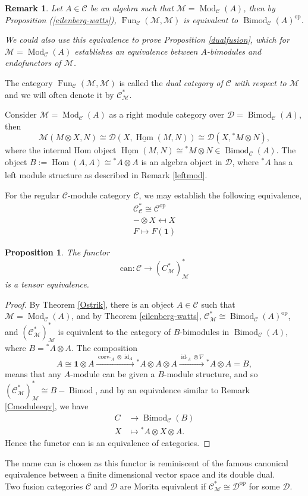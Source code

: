 \documentclass[11pt]{book}
\newtheorem{Prop}[theorem]{Proposition}
\theoremstyle{Rem}
\newtheorem{Rem}[theorem]{Remark}
\theoremstyle{definition}
\numberwithin{equation}{section}
\newcommand\id{\operatorname{id}}
\newcommand\ot{\otimes}
\newcommand\Bimod{\operatorname{Bimod}}
\newcommand\Fun{\operatorname{Fun}}
\newcommand\Hom{\operatorname{Hom}}
\newcommand\Mod{\operatorname{Mod}}
\newcommand\op{^{\text{op}}}
\newcommand\M{\mathcal{M}}
\newcommand\C{\mathcal C}
\newcommand\D{\mathcal D}
\newcommand{\ra}\rightarrow
\newcommand{\xra}\xrightarrow
\newcommand\one{\mathbf{1}}
\newcommand\coev{\operatorname{coev}}
\begin{document}
\begin{Rem}\rm
Let $A\in \C$ be an algebra such that $\M = \Mod_\C(A)$, then by Proposition (\ref{eilenberg-watts}),  $\Fun_\C(\M, \M)$ is equivalent to $\Bimod_\C(A)\op$.


 We could also use this equivalence to prove Proposition \ref{dualfusion}, which for $\M=\Mod_\C(A)$ establishes an equivalence between $A$-bimodules and endofunctors of $\M$.
\end{Rem}
The category $\Fun_\C(\M, \M)$ is called the \textit{dual category of $\C$ with respect to $\M$} and we will often denote it by $\C^*_\M$. 

Consider $\M = \Mod_\C(A)$ as a right module category over $\D =\Bimod_\C(A)$, then \begin{equation}
	\M(M\ot X, N) \cong \D(X, \underline{\Hom}(M, N)) \cong \D(X, {}^*M\ot N),
\end{equation} where the internal Hom  object $\underline{\Hom}(M, N) \cong {}^*M \ot N\in\Bimod_\C(A)$. The object $B:=\underline{\Hom(A, A)}\cong {}^*A\ot A$ is an algebra object in $\D$, where ${}^*A$ has a left module structure as described in Remark \ref{leftmod}. 

For the regular $\C$-module category $\C$, we may establish the following equivalence, 
\begin{align}
	\C^*_\C\cong \C\op\\
	- \ot X \mapsfrom X\\
	F \mapsto F(\one)
\end{align} 
\begin{Prop}
The functor \begin{equation}\label{can}
	\mathrm{can} : \C \ra (C^*_\M)^*_\M
\end{equation} is a tensor equivalence.
\end{Prop}
\begin{proof}
By Theorem \ref{Ostrik}, there is an object $A\in \C$ such that $\M =\Mod_\C(A)$, and by Theorem \ref{eilenberg-watts}, $\C^*_\M \cong \Bimod_\C(A)\op$, and $(\C^*_\M)^*_\M$ is equivalent to the category of $B$-bimodules in $\Bimod_\C(A)$, where $B={}^*A \ot A$.
The composition \begin{equation}
	A\cong \one \ot A \xra{\coev_{{}^*A}\ot \id_A} {}^*A \ot A \ot A \xra{\id_{{}^* A}\ot \nabla} {}^*A \ot A = B,
\end{equation} means that any $A$-module can be given a $B$-module structure, and so $(\C^*_\M)^*_\M \cong B-\Bimod$, and by an equivalence similar to Remark \ref{Cmoduleeqv}, we have \begin{align}
	C&\ra \Bimod_\C(B)\\
	X &\mapsto {}^*A \ot X \ot A.
\end{align}
Hence the functor can is an equivalence of categories.
\end{proof}
The name can is chosen as this functor is reminiscent of the famous canonical equivalence between a finite dimensional vector space and its double dual.\\
Two fusion categories $\C$ and $\D$ are Morita equivalent if $\C^*_\M \cong \D\op$ for some $\D$. 
\end{document}
